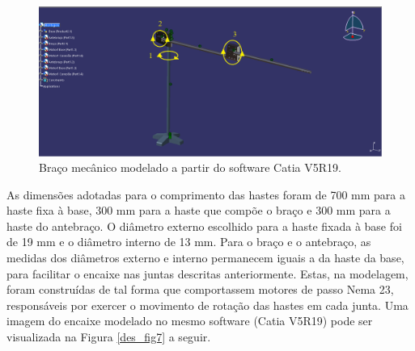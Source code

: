 \begin{figure}[H]
	\centering	\includegraphics[keepaspectratio=true,scale=0.4]{figuras/braco_mecanico_2.png}
	\caption{Braço mecânico modelado a partir do software Catia V5R19.}
	\label{des_fig6}
\end{figure}
 As dimensões adotadas para o comprimento das hastes foram de 700 mm para a haste fixa à base, 300 mm para a haste que compõe o braço e 300 mm para a haste do antebraço. O diâmetro externo escolhido para a haste fixada à base foi de 19 mm e o diâmetro interno de 13 mm. Para o braço e o antebraço, as medidas dos diâmetros externo e interno permanecem iguais a da haste da base, para facilitar o encaixe nas juntas descritas anteriormente. Estas, na modelagem, foram construídas de tal forma que comportassem motores de passo Nema 23, responsáveis por exercer o movimento de rotação das hastes em cada junta. Uma imagem do encaixe modelado no mesmo software (Catia V5R19) pode ser visualizada na Figura \ref{des_fig7} a seguir.

